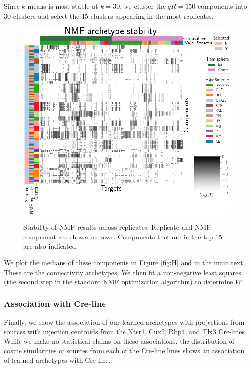 Since $k$-means is most stable at $k=30$, we cluster the $qR = 150$ components into $30$ clusters and select the $15$ clusters appearing in the most replicates.
\begin{figure}[H]
    \centering
    \includegraphics[width = 5in]{figs/nmfcluster.png} 
    \label{fig:distances}
    \caption{Stability of NMF results across replicates. 
    Replicate and NMF component are shown on rows.
    Components that are in the top $15$ are also indicated.}
\end{figure}
We plot the medians of these components in Figure \ref{fig:H} and in the main text.  These are the connectivity archetypes.  
We then fit a non-negative least squares (the second step in the standard NMF optimization algorithm) to determine $W$ \citep{Lee2000-yl}


\newpage

\subsubsection{Association with Cre-line}

Finally, we show the association of our learned archetypes with projections from sources with injection centroids from the Ntsr1, Cux2, Rbp4, and Tlx3 Cre-lines.  
While we make no statistical claims on these associations, the distribution of cosine similarities of sources from each of the Cre-line lines shows an association of learned archetypes with Cre-line.

